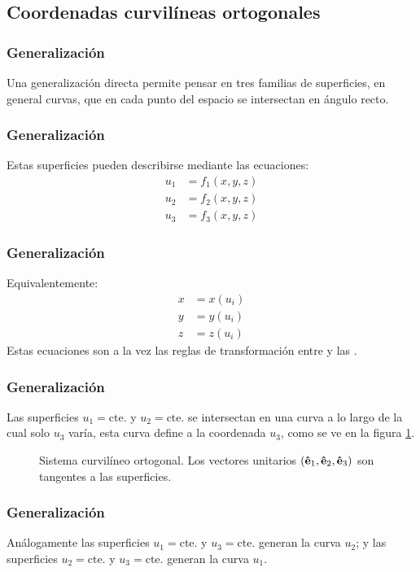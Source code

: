 \documentclass[12pt]{beamer}
\begin{document}
\subsection{Coordenadas curvilíneas ortogonales}

\begin{frame}
\frametitle{Generalización}
Una generalización directa permite pensar en tres familias de superficies, en general curvas, que en cada punto del espacio se intersectan en ángulo recto.
\end{frame}
\begin{frame}
\frametitle{Generalización}
Estas superficies pueden describirse mediante las ecuaciones:
\begin{align*}
u_{1} &= f_{1}(x, y, z) \\
u_{2} &= f_{2}(x, y, z) \\
u_{3} &= f_{3}(x, y, z)
\end{align*}
\end{frame}
\begin{frame}
\frametitle{Generalización}
Equivalentemente:
\begin{align*}
x &= x(u_{i}) \\
y &= y(u_{i}) \\
z &= z(u_{i})
\end{align*}
\pause
Estas ecuaciones son a la vez las reglas de transformación entre  y las .
\end{frame}
\begin{frame}
\frametitle{Generalización}
Las superficies $u_{1} = \mbox{cte.}$ y $u_{2} = \mbox{cte.}$ se intersectan en una curva a lo largo de la cual solo $u_{3}$ varía, esta curva define a la coordenada $u_{3}$, como se ve en la figura \ref{fig:figura_Sistema_Curvilineo_Ortogonal}.
\end{frame}
\begin{frame}
\begin{figure}[h!]
   \centering
   
   \caption{Sistema curvilíneo ortogonal. Los vectores unitarios $(\vu{e}_{1}, \vu{e}_{2}, \vu{e}_{3})$ son tangentes a las superficies.}
   \label{fig:figura_Sistema_Curvilineo_Ortogonal}
\end{figure}
\end{frame}
\begin{frame}
   \frametitle{Generalización}
Análogamente las superficies $u_{1} = \mbox{cte.}$ y $u_{3} = \mbox{cte.}$ generan la curva $u_{2}$; y las superficies $u_{2} = \mbox{cte.}$ y $u_{3} = \mbox{cte.}$ generan la curva $u_{1}$.
\end{frame}
\end{document}

